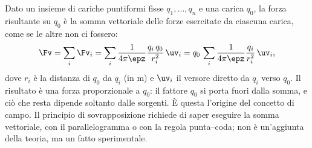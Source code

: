 \documentclass[main.tex]{subfiles}
\begin{document}
Dato un insieme di cariche puntiformi fisse $q_1,\dots,q_n$ e una carica $q_0$, la forza risultante su $q_0$ è la somma vettoriale delle forze esercitate da ciascuna carica, come se le altre non ci fossero:
\[
\Fv=\sum_i \Fv_i=\sum_i \frac{1}{4\pi\epz}\frac{q_i\,q_0}{r_i^2}\,\uv_i=q_0\,\sum_i \frac{1}{4\pi\epz}\frac{q_i}{r_i^2}\,\uv_i ,
\]
dove $r_i$ è la distanza di $q_0$ da $q_i$ (in m) e $\uv_i$ il versore diretto da $q_i$ verso $q_0$. Il risultato è una forza proporzionale a $q_0$: il fattore $q_0$ si porta fuori dalla somma, e ciò che resta dipende soltanto dalle sorgenti. È questa l'origine del concetto di campo. Il principio di sovrapposizione richiede di saper eseguire la somma vettoriale, con il parallelogramma o con la regola punta--coda; non è un'aggiunta della teoria, ma un fatto sperimentale.
\end{document}
